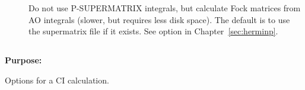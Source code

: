\begin{description}
\item[]
  Do not use P-SUPERMATRIX integrals, but calculate Fock matrices
  from AO integrals (slower, but requires less disk space). The
  default is to use the supermatrix file if it exists. See option
   in Chapter~\ref{sec:herminp}.

\end{description}

\pagebreak[3]
\subsection{\label{ref-cicinp}}

{\bf Purpose:}

Options for a CI calculation.

